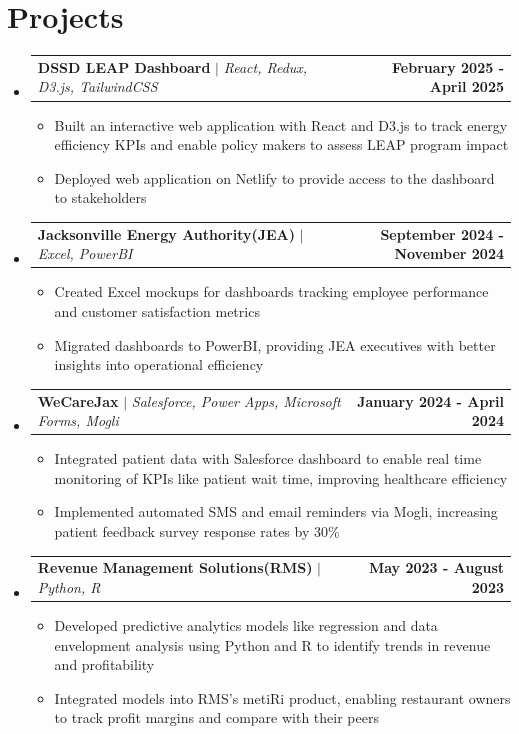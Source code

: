 \documentclass[letterpaper,11pt]{article}
\makeatletter
\newcommand{\resumeItem}[1]{
  \item\small{
    {#1 \vspace{-2pt}}
  }
}
\newcommand{\resumeProjectHeading}[2]{
    \item
    \begin{tabular*}{1.001\textwidth}{l@{\extracolsep{\fill}}r}
      \small#1 & \textbf{\small #2}\\
    \end{tabular*}\vspace{-7pt}
}
\newcommand{\resumeSubHeadingListStart}{\begin{itemize}[leftmargin=0.0in, label={}]}
\newcommand{\resumeSubHeadingListEnd}{\end{itemize}}
\newcommand{\resumeItemListStart}{\begin{itemize}}
\newcommand{\resumeItemListEnd}{\end{itemize}\vspace{-5pt}}
\makeatother
\begin{document}
\section{Projects}
    \vspace{-5pt}
    \resumeSubHeadingListStart
        \resumeProjectHeading
          {\textbf{DSSD LEAP Dashboard} $|$ \emph{React, Redux, D3.js, TailwindCSS}}{February 2025 - April 2025}
          \resumeItemListStart
            \resumeItem{Built an interactive web application with React and D3.js to track energy efficiency KPIs and enable policy makers to assess LEAP program impact}
            \resumeItem{Deployed web application on Netlify to provide access to the dashboard to stakeholders}
          \resumeItemListEnd
          \vspace{-13pt}
      \resumeProjectHeading
          {\textbf{Jacksonville Energy Authority(JEA)} $|$ \emph{Excel, PowerBI}}{September 2024 - November 2024 }
          \resumeItemListStart
            \resumeItem{Created Excel mockups for dashboards tracking employee performance and customer satisfaction metrics}
            \resumeItem{Migrated dashboards to PowerBI, providing JEA executives with better insights into operational efficiency}
          \resumeItemListEnd
          \vspace{-13pt}
      \resumeProjectHeading
          {\textbf{WeCareJax} $|$ \emph{Salesforce, Power Apps, Microsoft Forms, Mogli}}{January 2024 - April 2024}
          \resumeItemListStart
            \resumeItem{Integrated patient data with Salesforce dashboard to enable real time monitoring of KPIs like patient wait time, improving healthcare efficiency}
            \resumeItem{Implemented automated SMS and email reminders via Mogli, increasing patient feedback survey response rates by 30\%}
          \resumeItemListEnd
          \vspace{-13pt}
          \resumeProjectHeading
          {\textbf{Revenue Management Solutions(RMS)} $|$ \emph{Python, R}}{May 2023 - August 2023}
          \resumeItemListStart
            \resumeItem{Developed predictive analytics models like regression and data envelopment analysis using Python and R to identify trends in revenue and profitability}
            \resumeItem{Integrated models into RMS’s metiRi product, enabling restaurant owners to track profit margins and compare with their peers}
          \resumeItemListEnd 
    \resumeSubHeadingListEnd
\vspace{-15pt}


%
\end{document}
